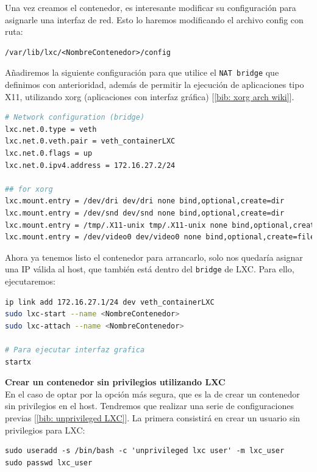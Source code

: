 \documentclass[12pt]{article}
\begin{document}
	\pagebreak
	
	\noindent Una vez creamos el contenedor, es interesante modificar su configuración para asignarle una interfaz de red. Esto lo haremos modificando el archivo config con ruta: 
	\begin{verbatim}
/var/lib/lxc/<NombreContenedor>/config
	\end{verbatim}
	\noindent Añadiremos la siguiente configuración para que utilice el \texttt{NAT bridge} que definimos con anterioridad, además de permitir la ejecución de aplicaciones tipo X11, utilizando xorg (aplicaciones con interfaz gráfica) [\ref{bib: xorg arch wiki}].
	\begin{lstlisting}[language=Bash, caption={Configuración interfaz NAT bridge y aplicaciones X a un contenedor LXC}]
# Network configuration (bridge)
lxc.net.0.type = veth
lxc.net.0.veth.pair = veth_containerLXC
lxc.net.0.flags = up
lxc.net.0.ipv4.address = 172.16.27.2/24

## for xorg
lxc.mount.entry = /dev/dri dev/dri none bind,optional,create=dir
lxc.mount.entry = /dev/snd dev/snd none bind,optional,create=dir
lxc.mount.entry = /tmp/.X11-unix tmp/.X11-unix none bind,optional,create=dir,ro
lxc.mount.entry = /dev/video0 dev/video0 none bind,optional,create=file
	\end{lstlisting}
	
	\noindent Ahora ya tenemos listo el contenedor para arrancarlo, solo nos quedaría asignar una IP válida al host, que también está dentro del \texttt{bridge} de LXC. Para ello, ejecutaremos:
	\begin{lstlisting}[language=Bash, caption={Asignar IP al host LXC y arrancar un contenedor}]
ip link add 172.16.27.1/24 dev veth_containerLXC
sudo lxc-start --name <NombreContenedor>
sudo lxc-attach --name <NombreContenedor>

# Para ejecutar interfaz grafica
startx
	\end{lstlisting}

	\vspace{20px}

	\noindent \textbf{\large Crear un contenedor sin privilegios utilizando LXC}\\
	
	\noindent En el caso de optar por la opción más segura, que es la de crear un contenedor sin privilegios en el host. Tendremos que realizar una serie de configuraciones previas [\ref{bib: unprivileged LXC}]. La primera consistirá en crear un usuario sin privilegios para LXC:
	\begin{verbatim}
sudo useradd -s /bin/bash -c 'unprivileged lxc user' -m lxc_user
sudo passwd lxc_user
	\end{verbatim}
\end{document}
